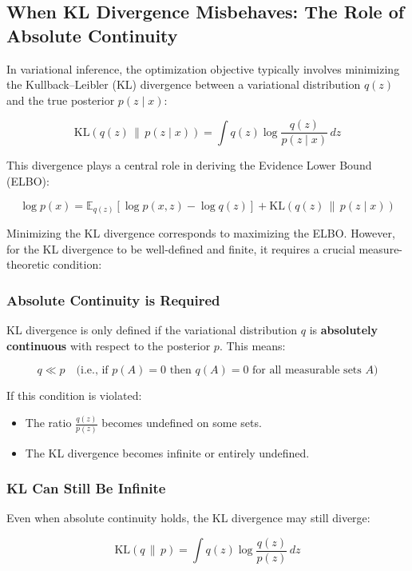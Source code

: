 \subsection{When KL Divergence Misbehaves: The Role of Absolute Continuity}

In variational inference, the optimization objective typically involves minimizing the Kullback–Leibler (KL) divergence between a variational distribution \( q(z) \) and the true posterior \( p(z \mid x) \):

\[
\mathrm{KL}(q(z) \,\|\, p(z \mid x)) = \int q(z) \log \frac{q(z)}{p(z \mid x)} \, dz
\]

This divergence plays a central role in deriving the Evidence Lower Bound (ELBO):

\[
\log p(x) = \mathbb{E}_{q(z)}[\log p(x, z) - \log q(z)] + \mathrm{KL}(q(z) \,\|\, p(z \mid x))
\]

Minimizing the KL divergence corresponds to maximizing the ELBO. However, for the KL divergence to be well-defined and finite, it requires a crucial measure-theoretic condition:

\subsubsection{Absolute Continuity is Required}

KL divergence is only defined if the variational distribution \( q \) is \textbf{absolutely continuous} with respect to the posterior \( p \). This means:

\[
q \ll p \quad \text{(i.e., if } p(A) = 0 \text{ then } q(A) = 0 \text{ for all measurable sets } A)
\]

If this condition is violated:
\begin{itemize}
    \item The ratio \( \frac{q(z)}{p(z)} \) becomes undefined on some sets.
    \item The KL divergence becomes infinite or entirely undefined.
\end{itemize}

\subsubsection{KL Can Still Be Infinite}

Even when absolute continuity holds, the KL divergence may still diverge:

\[
\mathrm{KL}(q \,\|\, p) = \int q(z) \log \frac{q(z)}{p(z)} \, dz
\]

